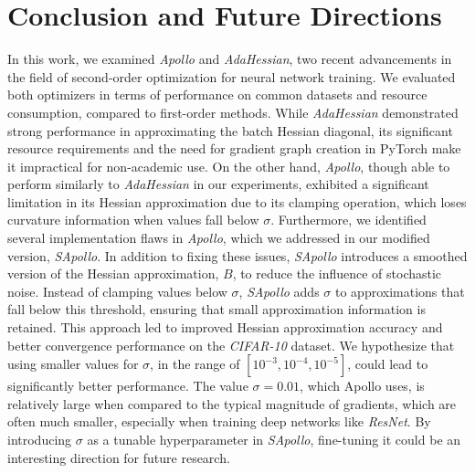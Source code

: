 
\chapter{Conclusion and Future Directions}
In this work, we examined \emph{Apollo} and \emph{AdaHessian}, two recent advancements in the field of second-order optimization for neural network training.
We evaluated both optimizers in terms of performance on common datasets and resource consumption,
compared to first-order methods. While \emph{AdaHessian} demonstrated strong performance in approximating the batch Hessian diagonal,
its significant resource requirements and the need for gradient graph creation in PyTorch make it impractical for non-academic use. 
On the other hand, \emph{Apollo}, though able to perform similarly to \emph{AdaHessian} in our experiments,
exhibited a significant limitation in its Hessian approximation due to its clamping operation,
which loses curvature information when values fall below $\sigma$.
Furthermore, we identified several implementation flaws in \emph{Apollo}, which we addressed in our modified version,
\emph{SApollo}.
In addition to fixing these issues, \emph{SApollo} introduces a smoothed version of the Hessian approximation,
$B$, to reduce the influence of stochastic noise. Instead of clamping values below $\sigma$, \emph{SApollo} adds $\sigma$ to approximations
that fall below this threshold, ensuring that small approximation information is retained.
This approach led to improved Hessian approximation accuracy and better convergence performance on the \emph{CIFAR-10} dataset.
We hypothesize that using smaller values for $\sigma$, in the range of $[10^{-3}, 10^{-4}, 10^{-5}]$,
could lead to significantly better performance.
The value $\sigma = 0.01$, which Apollo uses, is relatively large when compared to the typical magnitude of gradients,
which are often much smaller, especially when training deep networks like \emph{ResNet}.
By introducing $\sigma$ as a tunable hyperparameter in \emph{SApollo}, fine-tuning it could be an interesting direction for future research.


